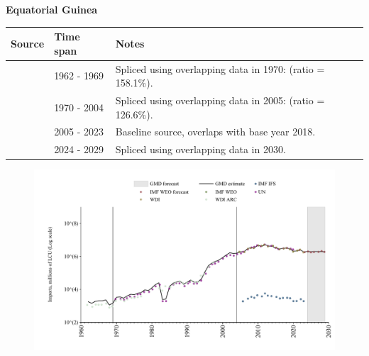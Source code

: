 \documentclass[12pt,a4paper,landscape]{article}
\begin{document}
\begin{adjustbox}{max totalsize={\paperwidth}{\paperheight},center}
\begin{minipage}[t][\textheight][t]{\textwidth}
\vspace*{0.5cm}
{}
\begin{center}
{\Large\bfseries Equatorial Guinea}
\end{center}
\vspace{0.5cm}
\begin{table}[H]
\centering
\small
\begin{tabular}{|l|l|l|}
\hline
\textbf{Source} & \textbf{Time span} & \textbf{Notes} \\
\hline
\rowcolor{white}\cite{WDI_ARC}& 1962 - 1969 &Spliced using overlapping data in 1970: (ratio = 158.1\%).\\
\rowcolor{lightgray}\cite{UN}& 1970 - 2004 &Spliced using overlapping data in 2005: (ratio = 126.6\%).\\
\rowcolor{white}\cite{WDI}& 2005 - 2023 &Baseline source, overlaps with base year 2018.\\
\rowcolor{lightgray}\cite{IMF_WEO_forecast}& 2024 - 2029 &Spliced using overlapping data in 2030.\\
\hline
\end{tabular}
\end{table}
\begin{figure}[H]
\centering
\includegraphics[width=\textwidth,height=0.6\textheight,keepaspectratio]{graphs/GNQ_imports.pdf}
\end{figure}
\end{minipage}
\end{adjustbox}
\end{document}
